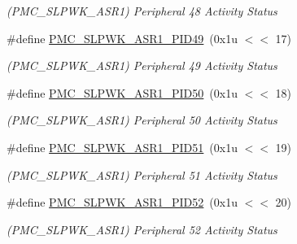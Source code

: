 \begin{DoxyCompactItemize}
\begin{DoxyCompactList}\small\item\em (P\+M\+C\+\_\+\+S\+L\+P\+W\+K\+\_\+\+A\+S\+R1) Peripheral 48 Activity Status \end{DoxyCompactList}\item 
\mbox{\label{group__SAMV71__PMC_ga3268f328d48ae9a3b9e16a46614695f1}} 
\#define \mbox{\hyperlink{group__SAMV71__PMC_ga3268f328d48ae9a3b9e16a46614695f1}{P\+M\+C\+\_\+\+S\+L\+P\+W\+K\+\_\+\+A\+S\+R1\+\_\+\+P\+I\+D49}}~(0x1u $<$$<$ 17)
\begin{DoxyCompactList}\small\item\em (P\+M\+C\+\_\+\+S\+L\+P\+W\+K\+\_\+\+A\+S\+R1) Peripheral 49 Activity Status \end{DoxyCompactList}\item 
\mbox{\label{group__SAMV71__PMC_ga2d2d99e2b2bfd6f7d495d9117a5104a4}} 
\#define \mbox{\hyperlink{group__SAMV71__PMC_ga2d2d99e2b2bfd6f7d495d9117a5104a4}{P\+M\+C\+\_\+\+S\+L\+P\+W\+K\+\_\+\+A\+S\+R1\+\_\+\+P\+I\+D50}}~(0x1u $<$$<$ 18)
\begin{DoxyCompactList}\small\item\em (P\+M\+C\+\_\+\+S\+L\+P\+W\+K\+\_\+\+A\+S\+R1) Peripheral 50 Activity Status \end{DoxyCompactList}\item 
\mbox{\label{group__SAMV71__PMC_ga79d9a2e4a1cebaf4c5e2fa569cdba3a7}} 
\#define \mbox{\hyperlink{group__SAMV71__PMC_ga79d9a2e4a1cebaf4c5e2fa569cdba3a7}{P\+M\+C\+\_\+\+S\+L\+P\+W\+K\+\_\+\+A\+S\+R1\+\_\+\+P\+I\+D51}}~(0x1u $<$$<$ 19)
\begin{DoxyCompactList}\small\item\em (P\+M\+C\+\_\+\+S\+L\+P\+W\+K\+\_\+\+A\+S\+R1) Peripheral 51 Activity Status \end{DoxyCompactList}\item 
\mbox{\label{group__SAMV71__PMC_ga59f5331fe305469aa38139c0cf95b61e}} 
\#define \mbox{\hyperlink{group__SAMV71__PMC_ga59f5331fe305469aa38139c0cf95b61e}{P\+M\+C\+\_\+\+S\+L\+P\+W\+K\+\_\+\+A\+S\+R1\+\_\+\+P\+I\+D52}}~(0x1u $<$$<$ 20)
\begin{DoxyCompactList}\small\item\em (P\+M\+C\+\_\+\+S\+L\+P\+W\+K\+\_\+\+A\+S\+R1) Peripheral 52 Activity Status \end{DoxyCompactList}\item 

\end{DoxyCompactItemize}

